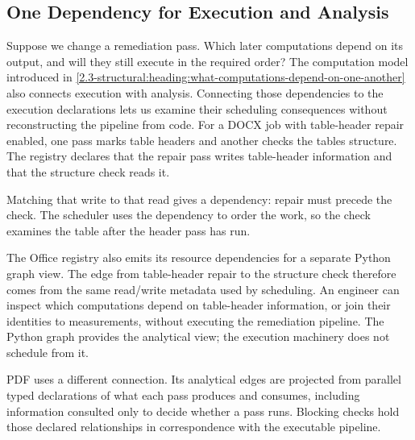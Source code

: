 \subsection{One Dependency for Execution and Analysis}

Suppose we change a remediation pass. Which later computations depend on its output, and will they still execute in the required order? The computation model introduced in \autoref{2.3-structural:heading:what-computations-depend-on-one-another} also connects execution with analysis. Connecting those dependencies to the execution declarations lets us examine their scheduling consequences without reconstructing the pipeline from code. For a DOCX job with table-header repair enabled, one pass marks table headers and another checks the table\textquotesingle s structure. The registry declares that the repair pass writes table-header information and that the structure check reads it.

Matching that write to that read gives a dependency: repair must precede the check. The scheduler uses the dependency to order the work, so the check examines the table after the header pass has run.


The Office registry also emits its resource dependencies for a separate Python graph view. The edge from table-header repair to the structure check therefore comes from the same read/write metadata used by scheduling. An engineer can inspect which computations depend on table-header information, or join their identities to measurements, without executing the remediation pipeline. The Python graph provides the analytical view; the execution machinery does not schedule from it.

PDF uses a different connection. Its analytical edges are projected from parallel typed declarations of what each pass produces and consumes, including information consulted only to decide whether a pass runs. Blocking checks hold those declared relationships in correspondence with the executable pipeline.

